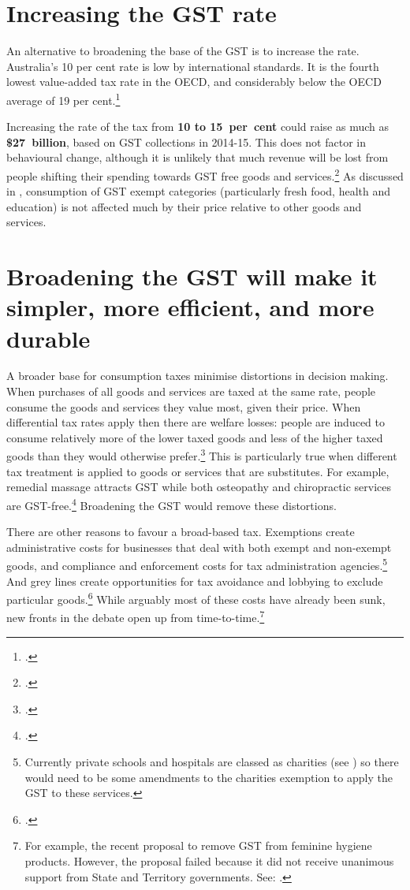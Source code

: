 \section{Increasing the GST rate}\label{sec:GST-2-2}
An alternative to broadening the base of the GST is to increase the rate. Australia’s 10 per cent rate is low by international standards. It is the fourth lowest value-added tax rate in the OECD, and considerably below the OECD average of 19 per cent.\footcite{OECDKoreaInstitutePublicFinance2014-Distributional-Effects-Consumption-Taxes}  

Increasing the rate of the tax from \textbf{10 to 15~per~cent} could raise as much as \textbf{\$27~billion}, based on GST collections in 2014-15. This does not factor in behavioural change, although it is unlikely that much revenue will be lost from people shifting their spending towards GST free goods and services.\footcite{KPMGEconotech2011-GST}  As discussed in , consumption of GST exempt categories (particularly fresh food, health and education) is not affected much by their price relative to other goods and services.

\section{Broadening the GST will make it simpler, more efficient, and more durable}\label{sec:GST-2-3}
A broader base for consumption taxes minimise distortions in decision making. When purchases of all goods and services are taxed at the same rate, people consume the goods and services they value most, given their price. When differential tax rates apply then there are welfare losses: people are induced to consume relatively more of the lower taxed goods and less of the higher taxed goods than they would otherwise prefer.\footcite{AtkinsonStiglitz1976}  This is particularly true when different tax treatment is applied to goods or services that are substitutes. For example, remedial massage attracts GST while both osteopathy and chiropractic services are GST-free.\footcite[][\S38-7]{GST-Act-1999}  Broadening the GST would remove these distortions.  

There are other reasons to favour a broad-based tax. Exemptions create administrative costs for businesses that deal with both exempt and non-exempt goods, and compliance and enforcement costs for tax administration agencies.\footnote{Currently private schools and hospitals are classed as charities (see \textcite{ACNC2015}) so there would need to be some amendments to the charities exemption to apply the GST to these services.}  And grey lines create opportunities for tax avoidance and lobbying to exclude particular goods.\footcite{Freebairn2015}  While arguably most of these costs have already been sunk, new fronts in the debate open up from time-to-time.\footnote{For example, the recent proposal to remove GST from feminine hygiene products. However, the proposal failed because it did not receive unanimous support from State and Territory governments. See: \textcite{Hockey2015-Federal-Finance-Relations}.}  

